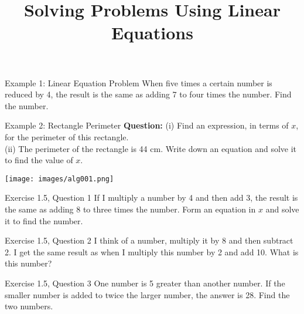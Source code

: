 \documentclass[leqno,usenames,dvipsnames,14pt]{beamer}
\title{Solving Problems Using Linear Equations}
\author{}
\date{}
\begin{document}
\begin{frame}
    \titlepage
\end{frame}

\begin{frame}{Example 1: Linear Equation Problem}
\Large
  When five times a certain number is reduced by 4, the result is the same as adding 7 to four times the number. Find the number.
\end{frame}

\begin{frame}{Example 2: Rectangle Perimeter}
    \textbf{Question:} (i) Find an expression, in terms of \( x \), for the perimeter of this rectangle.\\
    (ii) The perimeter of the rectangle is 44 cm. Write down an equation and solve it to find the value of \( x \).
    
    \begin{center}
        \texttt{[image: images/alg001.png]}
    \end{center}
\end{frame}

\begin{frame}
\end{frame}








\begin{frame}{Exercise 1.5, Question 1}
\Large
  If I multiply a number by 4 and then add 3, the result is the same as adding 8 to three times the number. Form an equation in \( x \) and solve it to find the number.
\end{frame}

\begin{frame}{Exercise 1.5, Question 2}
\Large
  I think of a number, multiply it by 8 and then subtract 2. I get the same result as when I multiply this number by 2 and add 10. What is this number?
\end{frame}

\begin{frame}{Exercise 1.5, Question 3}
\Large
  One number is 5 greater than another number. If the smaller number is added to twice the larger number, the answer is 28. Find the two numbers.
\end{frame}
\end{document}
